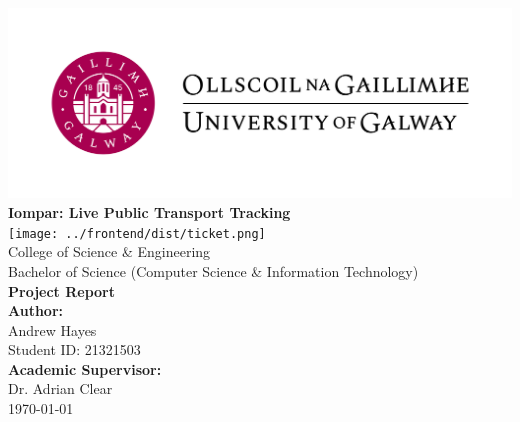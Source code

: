 \documentclass[a4paper,11pt]{report}
\author{Andrew Hayes}
\begin{document}
\begin{titlepage}
    \begin{center}

        \vfill
        \includegraphics[width=\textwidth]{./images/Logo-UGalway-2-3166136658.jpg} \\[1cm]

        {\Huge \textbf{Iompar: Live Public Transport Tracking}} \\[0.5cm]
        
        \texttt{[image: ../frontend/dist/ticket.png]} \\[1cm]

        {\Large College of Science \& Engineering} \\[0.3cm]
        {\large Bachelor of Science (Computer Science \& Information Technology)} \\[0.5cm]

        {\large \textbf{Project Report}} \\[1.5cm]

        {\Large \textbf{Author:}} \\[0.2cm]
        {\large Andrew Hayes \\ Student ID: 21321503 } \\[1cm]

        {\Large \textbf{Academic Supervisor:}} \\[0.2cm]
        {\large Dr. Adrian Clear} \\[1.5cm]

        {\Large \today}
        \vfill
    \end{center}
\end{titlepage}

\newpage
\tableofcontents
\newpage
\setcounter{page}{1}

\end{document}
